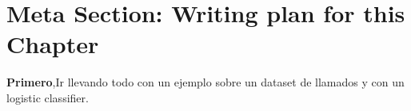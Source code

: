 \section{Meta Section: Writing plan for this Chapter}
\textbf{Primero},Ir llevando todo con un ejemplo sobre un dataset de llamados y con un logistic classifier.

